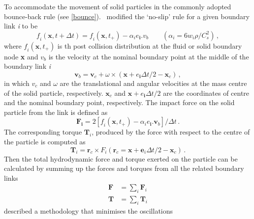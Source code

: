 To accommodate the movement of solid particles in the commonly adopted 
bounce-back rule (see \cref{bounce}).~\citet{Ladd1994} modified the `no-slip' 
rule for a given boundary link \textit{i} to be
%
\begin{equation}
\mathit{f_i}(\mathbf{x}, t + \Delta t)=\mathit{f_i}(\mathbf{x}, t_{+}) - 
\alpha_{\mathit{i}}\mathbf{\mathit{e}_i}.\mathbf{\mathit{v}}_{b} \qquad 
(\alpha_{i}=6\mathit{w_i}\rho/\mathit{C}_{\mathit{s}}^{2})\,,
\end{equation}
%
\noindent where $\mathit{f_i}(\mathbf{x}, t_{+})$ is th post collision 
distribution at the fluid or solid boundary node \textbf{x} and 
$\mathit{v}_{b}$ is the velocity at the nominal boundary point at the middle of 
the boundary link \textit{i}
%
\begin{equation}
\mathbf{v}_{b}=\mathbf{v}_{c}+\omega \times 
(\mathbf{x}+\mathbf{\mathit{e}_i}\Delta t /2 - \mathbf{x}_{c})\,,
\end{equation}
%
\noindent in which $\mathbf{\mathit{v}}_{c}$ and $\omega$ are the translational 
and angular velocities at the mass centre of the solid particle, respectively. 
$\mathbf{x}_{c}$ and $\mathbf{x}+\mathbf{\mathit{e}_i}\Delta t /2$ are the 
coordinates of centre and the nominal boundary point,  respectively. The impact 
force on the solid particle from the link is defined as
%
\begin{equation}
\mathbf{F_i}=2[\mathit{f_i} (\mathbf{x}, t_{+}) 
-\alpha_{\mathit{i}}\mathbf{\mathit{e}_i}.\mathbf{v}_{b}]/ \Delta t \,.
\end{equation} 
%
The corresponding torque $\mathbf{T}_{\mathit{i}}$, produced by the force with 
respect to the centre of the particle is computed as
%
\begin{equation}
\mathbf{T}_{\mathit{i}}=\mathbf{r}_{c} \times \mathit{F_i} 
(\mathbf{r}_{c}=\mathbf{x}+\mathbf{e}_{\mathit{i}} \Delta t /2 - \mathbf{x}_{c})
\,.
\end{equation}
%
Then the total hydrodynamic force and torque exerted on the particle can be 
calculated by summing up the forces and torques from all the related boundary 
links
%
\begin{equation}
\begin{aligned}
\mathbf{F} &= \sum\limits_{\mathit{i}}{\mathbf{F}_{\mathit{i}}} \\
\mathbf{T} &= \sum\limits_{\mathit{i}}{\mathbf{T}_{\mathit{i}}}
\end{aligned}
\end{equation}
%
\citet{Ladd2001} described a methodology that minimises the oscillations 
